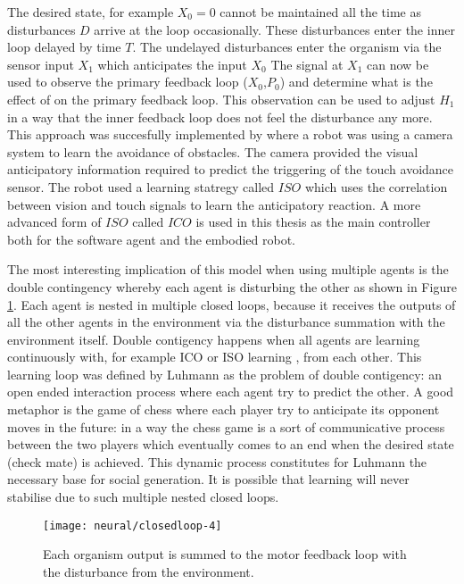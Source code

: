 The desired state, for example $X_0=0$ cannot be maintained all the time
as disturbances $D$ arrive at the loop occasionally. These disturbances enter
the inner loop delayed by time $T$. The undelayed disturbances enter the organism
via the sensor input $X_1$ which anticipates the input $X_0$ The signal at $X_1$
can now be used to observe the primary feedback loop ($X_0$,$P_0$) and determine 
what is the effect of on the primary feedback loop. This observation can be used to adjust
$H_1$ in a way that the inner feedback loop does not feel the disturbance any more.
This approach was succesfully implemented by \citet{PorrNecoISO2003} where a 
robot was using a camera system to learn the avoidance of obstacles.
The camera provided the visual anticipatory information required to predict the 
triggering of the touch avoidance sensor.
The robot used a learning statregy called $ISO$ which uses the correlation between
 vision and touch signals to learn the anticipatory reaction.
A more advanced form of $ISO$ called $ICO$ is used in this thesis as the main controller
 both for the software agent and the embodied robot.

The most interesting implication of this model when using multiple agents is the 
double contingency whereby each agent is disturbing the other as shown in Figure 
\ref{Fig:Neural:MutualDisturbance}.
Each agent is nested in multiple closed loops, because it receives the outputs of 
all the other agents in the environment via the disturbance summation with the 
environment itself.
Double contigency happens when all agents are learning continuously with, for example
ICO \citep{Porr2006ICO} or ISO \citep{PorrNecoISO2003} learning , from each other.
This learning loop was defined by Luhmann as the problem of double contigency:
an open ended interaction process where each agent try to predict the other.
A good metaphor is the game of chess where each player try to anticipate its opponent 
moves in the future: in a way the chess game is a sort of communicative process between
the two players which eventually comes to an end when the desired state (check mate) 
is achieved.
This dynamic process constitutes for Luhmann the necessary base for social generation.
It is possible that learning will never stabilise due to such multiple nested
 closed loops.

\begin{figure}[htbp]
\begin{center}
\texttt{[image: neural/closedloop-4]}
\end{center}
\small{
\caption[Double contigency]{
Each organism output is summed to the motor feedback loop with the 
disturbance from the environment.
\label{Fig:Neural:MutualDisturbance}}}
\end{figure} 

